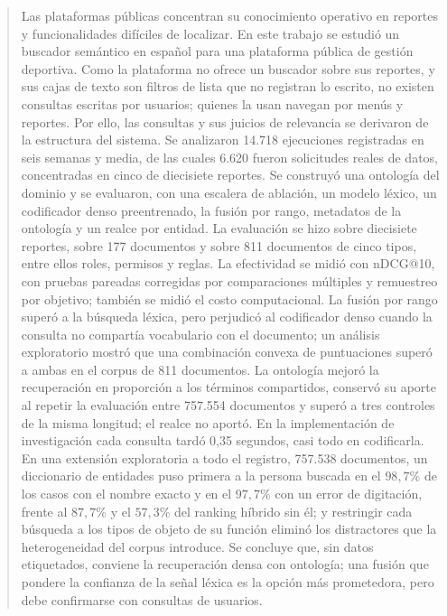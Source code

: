 \documentclass[11pt,letterpaper]{article}
\numberwithin{equation}{section}
\begin{document}
\begin{abstract}
Las plataformas públicas concentran su conocimiento operativo en reportes y funcionalidades difíciles de localizar. En este trabajo se estudió un buscador semántico en español para una plataforma pública de gestión deportiva. Como la plataforma no ofrece un buscador sobre sus reportes, y sus cajas de texto son filtros de lista que no registran lo escrito, no existen consultas escritas por usuarios; quienes la usan navegan por menús y reportes. Por ello, las consultas y sus juicios de relevancia se derivaron de la estructura del sistema. Se analizaron 14.718 ejecuciones registradas en seis semanas y media, de las cuales 6.620 fueron solicitudes reales de datos, concentradas en cinco de diecisiete reportes. Se construyó una ontología del dominio y se evaluaron, con una escalera de ablación, un modelo léxico, un codificador denso preentrenado, la fusión por rango, metadatos de la ontología y un realce por entidad. La evaluación se hizo sobre diecisiete reportes, sobre 177 documentos y sobre 811 documentos de cinco tipos, entre ellos roles, permisos y reglas. La efectividad se midió con nDCG@10, con pruebas pareadas corregidas por comparaciones múltiples y remuestreo por objetivo; también se midió el costo computacional. La fusión por rango superó a la búsqueda léxica, pero perjudicó al codificador denso cuando la consulta no compartía vocabulario con el documento; un análisis exploratorio mostró que una combinación convexa de puntuaciones superó a ambas en el corpus de 811 documentos. La ontología mejoró la recuperación en proporción a los términos compartidos, conservó su aporte al repetir la evaluación entre 757.554 documentos y superó a tres controles de la misma longitud; el realce no aportó. En la implementación de investigación cada consulta tardó 0,35 segundos, casi todo en codificarla. En una extensión exploratoria a todo el registro, 757.538 documentos, un diccionario de entidades puso primera a la persona buscada en el $98{,}7\%$ de los casos con el nombre exacto y en el $97{,}7\%$ con un error de digitación, frente al $87{,}7\%$ y el $57{,}3\%$ del ranking híbrido sin él; y restringir cada búsqueda a los tipos de objeto de su función eliminó los distractores que la heterogeneidad del corpus introduce. Se concluye que, sin datos etiquetados, conviene la recuperación densa con ontología; una fusión que pondere la confianza de la señal léxica es la opción más prometedora, pero debe confirmarse con consultas de usuarios.
\end{abstract}
\end{document}
